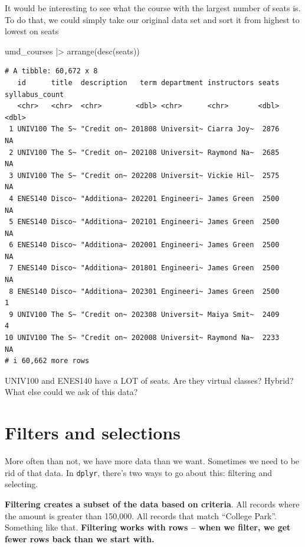 \documentclass[
  letterpaper,
  DIV=11,
  numbers=noendperiod]{scrreprt}
\newenvironment{Shaded}{\begin{snugshade}}{\end{snugshade}}
\newcommand{\FunctionTok}[1]{\textcolor[rgb]{0.28,0.35,0.67}{#1}}
\newcommand{\NormalTok}[1]{\textcolor[rgb]{0.00,0.23,0.31}{#1}}
\newcommand{\SpecialCharTok}[1]{\textcolor[rgb]{0.37,0.37,0.37}{#1}}
\begin{document}
It would be interesting to see what the course with the largest number
of seats is. To do that, we could simply take our original data set and
sort it from highest to lowest on seats

\begin{Shaded}
\begin{Highlighting}[]
\NormalTok{umd\_courses }\SpecialCharTok{|\textgreater{}}
  \FunctionTok{arrange}\NormalTok{(}\FunctionTok{desc}\NormalTok{(seats))}
\end{Highlighting}
\end{Shaded}

\begin{verbatim}
# A tibble: 60,672 x 8
   id      title  description   term department instructors seats syllabus_count
   <chr>   <chr>  <chr>        <dbl> <chr>      <chr>       <dbl>          <dbl>
 1 UNIV100 The S~ "Credit on~ 201808 Universit~ Ciarra Joy~  2876             NA
 2 UNIV100 The S~ "Credit on~ 202108 Universit~ Raymond Na~  2685             NA
 3 UNIV100 The S~ "Credit on~ 202208 Universit~ Vickie Hil~  2575             NA
 4 ENES140 Disco~ "Additiona~ 202201 Engineeri~ James Green  2500             NA
 5 ENES140 Disco~ "Additiona~ 202101 Engineeri~ James Green  2500             NA
 6 ENES140 Disco~ "Additiona~ 202001 Engineeri~ James Green  2500             NA
 7 ENES140 Disco~ "Additiona~ 201801 Engineeri~ James Green  2500             NA
 8 ENES140 Disco~ "Additiona~ 202301 Engineeri~ James Green  2500              1
 9 UNIV100 The S~ "Credit on~ 202308 Universit~ Maiya Smit~  2409              4
10 UNIV100 The S~ "Credit on~ 202008 Universit~ Raymond Na~  2233             NA
# i 60,662 more rows
\end{verbatim}

UNIV100 and ENES140 have a LOT of seats. Are they virtual classes?
Hybrid? What else could we ask of this data?


\hypertarget{filters-and-selections}{%
\chapter{Filters and selections}\label{filters-and-selections}}

More often than not, we have more data than we want. Sometimes we need
to be rid of that data. In \texttt{dplyr}, there's two ways to go about
this: filtering and selecting.

\textbf{Filtering creates a subset of the data based on criteria}. All
records where the amount is greater than 150,000. All records that match
``College Park''. Something like that. \textbf{Filtering works with rows
-- when we filter, we get fewer rows back than we start with.}
\end{document}
